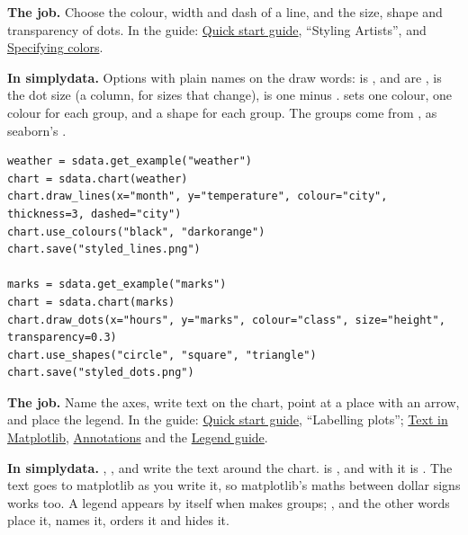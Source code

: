 
\textbf{The job.} Choose the colour, width and dash of a line, and the size, shape and transparency of
dots. In the guide: \href{https://matplotlib.org/stable/users/explain/quick_start.html}{Quick start
guide}, ``Styling Artists'', and
\href{https://matplotlib.org/stable/users/explain/colors/colors.html}{Specifying colors}.

\textbf{In simplydata.} Options with plain names on the draw words:  is
,  and  are ,  is the
dot size (a column, for sizes that change),  is one minus .
 sets one colour,  one colour for each group, and
 a shape for each group. The groups come from , as seaborn's
.

\begin{lstlisting}[style=py]
weather = sdata.get_example("weather")
chart = sdata.chart(weather)
chart.draw_lines(x="month", y="temperature", colour="city", thickness=3, dashed="city")
chart.use_colours("black", "darkorange")
chart.save("styled_lines.png")

marks = sdata.get_example("marks")
chart = sdata.chart(marks)
chart.draw_dots(x="hours", y="marks", colour="class", size="height", transparency=0.3)
chart.use_shapes("circle", "square", "triangle")
chart.save("styled_dots.png")
\end{lstlisting}


\textbf{The job.} Name the axes, write text on the chart, point at a place with an arrow, and place
the legend. In the guide: \href{https://matplotlib.org/stable/users/explain/quick_start.html}{Quick
start guide}, ``Labelling plots'';
\href{https://matplotlib.org/stable/users/explain/text/text_intro.html}{Text in Matplotlib},
\href{https://matplotlib.org/stable/users/explain/text/annotations.html}{Annotations} and the
\href{https://matplotlib.org/stable/users/explain/axes/legend_guide.html}{Legend guide}.

\textbf{In simplydata.} , ,  and
 write the text around the chart.  is
, and with  it is . The text goes to
matplotlib as you write it, so matplotlib's maths between dollar signs works too. A legend appears by
itself when  makes groups; , 
and the other  words place it,  names it,
 orders it and  hides it.

